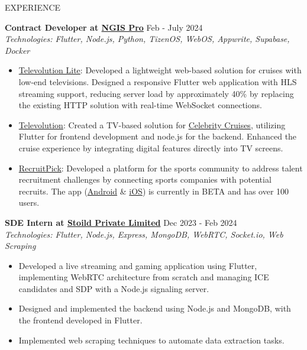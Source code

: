 \documentclass{resume} %
\begin{document}
\begin{rSection}{EXPERIENCE}

\textbf{Contract Developer at \href{https://ngispro.com/}{NGIS Pro}} \hfill Feb - July 2024\\
\textit{Technologies: Flutter, Node.js, Python, TizenOS, WebOS, Appwrite, Supabase, Docker}
 \begin{itemize}
    \itemsep -3pt {}
    \item \href{https://mytvpocroyal.com/lite/}{Televolution Lite}: Developed a lightweight web-based solution for cruises with low-end televisions. Designed a responsive Flutter web application with HLS streaming support, reducing server load by approximately 40\% by replacing the existing HTTP solution with real-time WebSocket connections.
    \item \href{https://mytvpocroyal.com/web2}{Televolution}: Created a TV-based solution for \href{https://www.celebritycruises.com}{Celebrity Cruises}, utilizing Flutter for frontend development and node.js for the backend. Enhanced the cruise experience by integrating digital features directly into TV screens.
    \item \href{https://recruitpick.com}{RecruitPick}: Developed a platform for the sports community to address talent recruitment challenges by connecting sports companies with potential recruits. The app (\href{https://play.google.com/store/apps/details?id=com.recruitpick.app.prod}{Android} \& \href{https://apps.apple.com/in/app/recruit-pick-inc/id6478814537}{iOS}) is currently in BETA and has over 100 users.
 \end{itemize}

\textbf{SDE Intern at \href{https://stoild.in/}{Stoild Private Limited}} \hfill Dec 2023 - Feb 2024\\
\textit{Technologies: Flutter, Node.js, Express, MongoDB, WebRTC, Socket.io, Web Scraping}
 \begin{itemize}
    \itemsep -3pt {}
     \item Developed a live streaming and gaming application using Flutter, implementing WebRTC architecture from scratch and managing ICE candidates and SDP with a Node.js signaling server.
     \item Designed and implemented the backend using Node.js and MongoDB, with the frontend developed in Flutter.
     \item Implemented web scraping techniques to automate data extraction tasks.
 \end{itemize}


\end{rSection}
\end{document}
